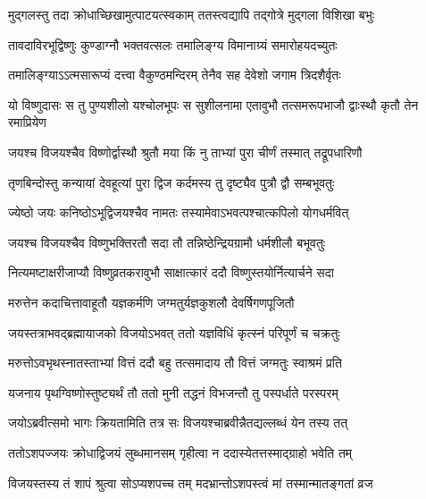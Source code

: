 \twolineshloka
{मुद्गलस्तु तदा क्रोधाच्छिखामुत्पाटयत्स्वकाम्}
{ततस्त्वद्यापि तद्गोत्रे मुद्गला विशिखा बभुः} %

\twolineshloka
{तावदाविरभूद्विष्णुः कुण्डाग्नौ भक्तवत्सलः}
{तमालिङ्ग्य विमानाग्र्यं समारोहयदच्युतः} %

\twolineshloka
{तमालिङ्ग्याऽऽत्मसारूप्यं दत्त्वा वैकुण्ठमन्दिरम्}
{तेनैव सह देवेशो जगाम त्रिदशैर्वृतः} %


\fourlineindentedshloka
{यो विष्णुदासः स तु पुण्यशीलो}
{यश्चोलभूपः स सुशीलनामा}
{एतावुभौ तत्समरूपभाजौ}
{द्वाःस्थौ कृतौ तेन रमाप्रियेण} %





\twolineshloka
{जयश्च विजयश्चैव विष्णोर्द्वास्थौ श्रुतौ मया}
{किं नु ताभ्यां पुरा चीर्णं तस्मात् तद्रूपधारिणौ} %


\twolineshloka
{तृणबिन्दोस्तु कन्यायां देवहूत्यां पुरा द्विज}
{कर्दमस्य तु दृष्ट्यैव पुत्रौ द्वौ सम्बभूवतुः} %


\twolineshloka
{ज्येष्ठो जयः कनिष्ठोऽभूद्विजयश्चैव नामतः}
{तस्यामेवाऽभवत्पश्चात्कपिलो योगधर्मवित्} %

\twolineshloka
{जयश्च विजयश्चैव विष्णुभक्तिरतौ सदा}
{तौ तन्निष्ठेन्द्रियग्रामौ धर्मशीलौ बभूवतुः} %

\twolineshloka
{नित्यमष्टाक्षरीजाप्यौ विष्णुव्रतकरावुभौ}
{साक्षात्कारं ददौ विष्णुस्तयोर्नित्यार्चने सदा} %

\twolineshloka
{मरुत्तेन कदाचित्तावाहूतौ यज्ञकर्मणि}
{जग्मतुर्यज्ञकुशलौ देवर्षिगणपूजितौ} %

\twolineshloka
{जयस्तत्राभवद्ब्रह्मायाजको विजयोऽभवत्}
{ततो यज्ञविधिं कृत्स्नं परिपूर्णं च चक्रतुः} %

\twolineshloka
{मरुत्तोऽवभृथस्नातस्ताभ्यां वित्तं ददौ बहु}
{तत्समादाय तौ वित्तं जग्मतुः स्वाश्रमं प्रति} %

\twolineshloka
{यजनाय पृथग्विष्णोस्तुष्ट्यर्थं तौ ततो मुनी}
{तद्धनं विभजन्तौ तु पस्पर्धाते परस्परम्} %

\twolineshloka
{जयोऽब्रवीत्समो भागः क्रियतामिति तत्र सः}
{विजयश्चाब्रवीन्नैतद्यल्लब्धं येन तस्य तत्} %

\twolineshloka
{ततोऽशपज्जयः क्रोधाद्विजयं लुब्धमानसम्}
{गृहीत्वा न ददास्येतत्तस्माद्ग्राहो भवेति तम्} %

\twolineshloka
{विजयस्तस्य तं शापं श्रुत्वा सोऽप्यशपच्च तम्}
{मदभ्रान्तोऽशपस्त्वं मां तस्मान्मातङ्गतां व्रज} %

